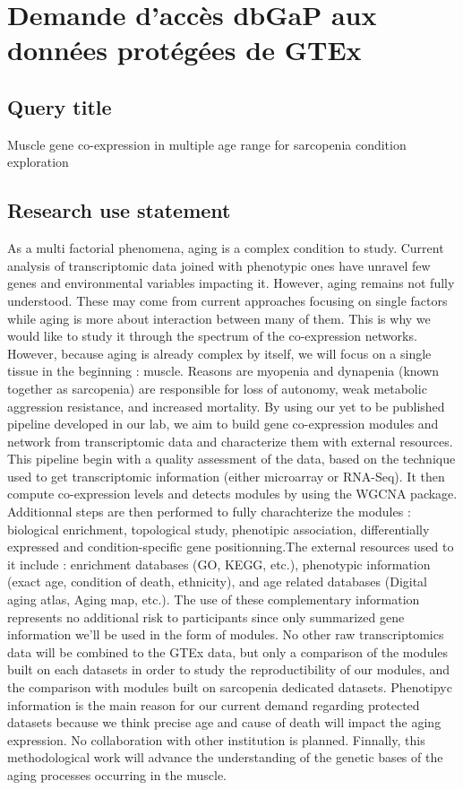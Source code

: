 \chapter{Demande d'accès dbGaP aux données protégées de GTEx}
\label{annexe:dbgap}

\section{Query title}
Muscle gene co-expression in multiple age range for sarcopenia condition exploration

\section{Research use statement}
As a multi factorial phenomena, aging is a complex condition to study. Current analysis of transcriptomic data joined with phenotypic ones have unravel few genes and environmental variables impacting it. However, aging remains not fully understood. These may come from current approaches focusing on single factors while aging is more about interaction between many of them. This is why we would like to study it through the spectrum of the co-expression networks. However, because aging is already complex by itself, we will focus on a single tissue in the beginning : muscle. Reasons are myopenia and dynapenia (known together as sarcopenia) are responsible for loss of autonomy, weak metabolic aggression resistance, and increased mortality.
By using our yet to be published pipeline developed in our lab, we aim to build gene co-expression modules and network from transcriptomic data and characterize them with external resources. This pipeline begin with a quality assessment of the data, based on the technique used to get transcriptomic information (either microarray or RNA-Seq). It then compute co-expression levels and detects modules by using the WGCNA package. Additionnal steps are then performed to fully charachterize the modules : biological enrichment, topological study, phenotipic association, differentially expressed and condition-specific gene positionning.The external resources used to it include : enrichment databases (GO, KEGG, etc.), phenotypic information (exact age, condition of death, ethnicity), and age related databases (Digital aging atlas, Aging map, etc.). The use of these complementary information represents no additional risk to participants since only summarized gene information we'll be used in the form of modules. No other raw transcriptomics data will be combined to the GTEx data, but only a comparison of the modules built on each datasets in order to study the reproductibility of our modules, and the comparison with modules built on sarcopenia dedicated datasets.
Phenotipyc information is the main reason for our current demand regarding protected datasets because we think precise age and cause of death will impact the aging expression. 
No collaboration with other institution is planned.
Finnally, this methodological work will advance the understanding of the genetic bases of the aging processes occurring in the muscle.


